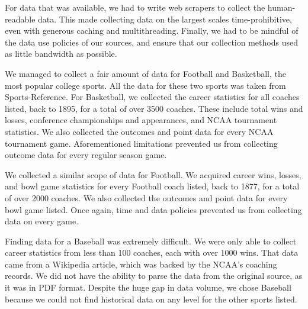 \documentclass[12pt]{article}
\begin{document}
For data that was available, we had to write web scrapers to collect the human-readable data. This made collecting data on the largest scales time-prohibitive, even with generous caching and multithreading. Finally, we had to be mindful of the data use policies of our sources, and ensure that our collection methods used as little bandwidth as possible.

We managed to collect a fair amount of data for Football and Basketball, the most popular college sports. All the data for these two sports was taken from Sports-Reference. For Basketball, we collected the career statistics for all coaches listed, back to 1895, for a total of over 3500 coaches. These include total wins and losses, conference championships and appearances, and NCAA tournament statistics. We also collected the outcomes and point data for every NCAA tournament game. Aforementioned limitations prevented us from collecting outcome data for every regular season game. 

We collected a similar scope of data for Football. We acquired career wins, losses, and bowl game statistics for every Football coach listed, back to 1877, for a total of over 2000 coaches. We also collected the outcomes and point data for every bowl game listed. Once again, time and data policies prevented us from collecting data on every game.

Finding data for a Baseball was extremely difficult. We were only able to collect career statistics from less than 100 coaches, each with over 1000 wins. That data came from a Wikipedia article, which was backed by the NCAA's coaching records. We did not have the ability to parse the data from the original source, as it was in PDF format. Despite the huge gap in data volume, we chose Baseball because we could not find historical data on any level for the other sports listed.
\end{document}

